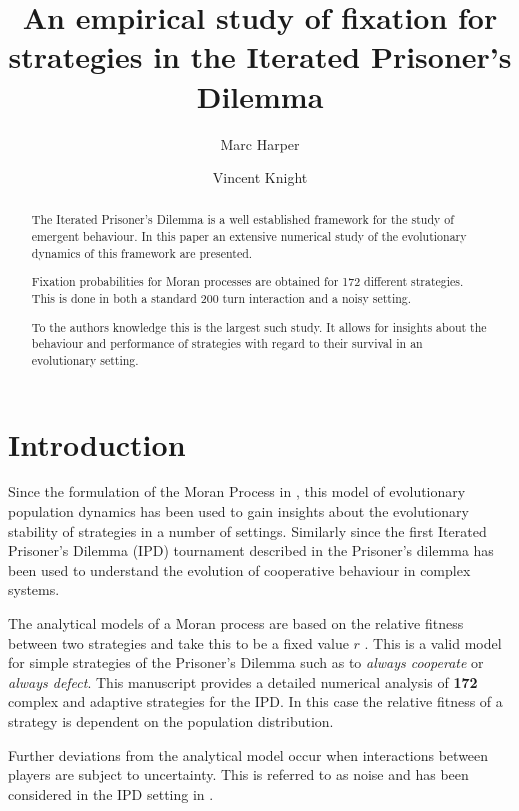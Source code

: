 \documentclass{article}
\title{An empirical study of fixation for strategies in the
       Iterated Prisoner's Dilemma}
\author{Marc Harper \and Vincent Knight} %
\date{}
\begin{document}
\maketitle

\begin{abstract}
    The Iterated Prisoner's Dilemma is a well established framework for
    the study of emergent behaviour. In this paper an extensive numerical
    study of the evolutionary dynamics of this framework are presented.

    Fixation probabilities for Moran processes are obtained for 172
    different strategies. This is done in both a standard 200 turn
    interaction and a noisy setting.

    To the authors knowledge this is the largest
    such study. It allows for insights about the behaviour and
    performance of strategies with regard to their survival in an
    evolutionary setting.
\end{abstract}  %

\section{Introduction}\label{sec:introduction}

Since the formulation of the Moran Process in \cite{Moran1957}, this model of
evolutionary population dynamics has been used to gain insights about the
evolutionary stability of strategies in a number of settings. Similarly since
the first Iterated Prisoner's Dilemma (IPD) tournament described in
\cite{Axelrod1980a} the Prisoner's dilemma has been used to understand the
evolution of cooperative behaviour in complex systems.

The analytical models of a Moran process are based on the relative fitness
between two strategies and take this to be a fixed value \(r\) \cite{Nowak}.
This is a valid model for simple strategies of the Prisoner's Dilemma such as to
\textit{always cooperate} or \textit{always defect}. This manuscript provides a
detailed numerical analysis of \textbf{172} complex and adaptive strategies for
the IPD\@. In this case the relative fitness of a strategy is dependent on the
population distribution.

Further deviations from the analytical model occur when interactions between
players are subject to uncertainty. This is referred to as noise and has been
considered in the IPD setting in \cite{Bendor1993, Nowak1993, Wu1995}.
\end{document}

